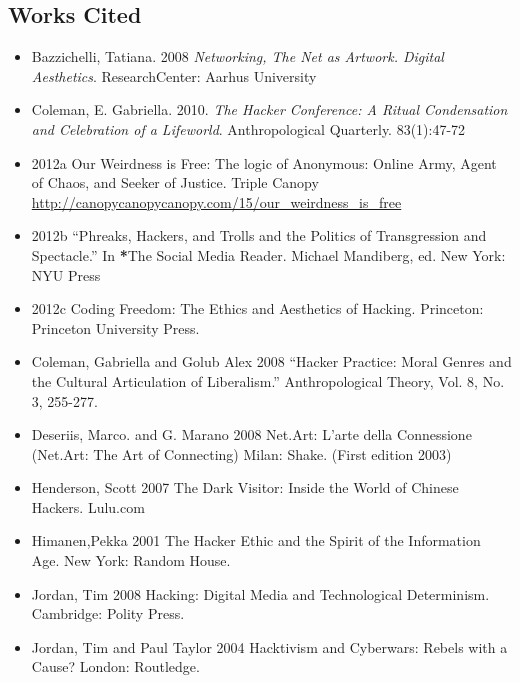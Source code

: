 \documentclass[letterpaper,12pt,english]{sphinxmanual}
\begin{document}
\subsection{Works Cited}
\label{preface:works-cited}\begin{itemize}
\item {} 
Bazzichelli, Tatiana. 2008 \emph{Networking, The Net as Artwork. Digital Aesthetics}. ResearchCenter: Aarhus University

\item {} 
Coleman, E. Gabriella. 2010. \emph{The Hacker Conference: A Ritual Condensation and Celebration of a Lifeworld}. Anthropological Quarterly. 83(1):47-72

\item {} 
2012a Our Weirdness is Free: The logic of Anonymous: Online Army, Agent of Chaos, and Seeker of Justice. Triple Canopy \href{http://canopycanopycanopy.com/15/our\_weirdness\_is\_free}{http://canopycanopycanopy.com/15/our\_weirdness\_is\_free}

\item {} 
2012b ``Phreaks, Hackers, and Trolls and the Politics of Transgression and Spectacle.'' In {\color{red}\bfseries{}*}The Social Media Reader. Michael Mandiberg, ed. New York: NYU Press

\item {} 
2012c Coding Freedom: The Ethics and Aesthetics of Hacking. Princeton: Princeton University Press.

\item {} 
Coleman, Gabriella and Golub Alex 2008 ``Hacker Practice: Moral Genres and the Cultural Articulation of Liberalism.” Anthropological Theory, Vol. 8, No. 3, 255-277.

\item {} 
Deseriis, Marco. and G. Marano 2008 Net.Art: L’arte della Connessione (Net.Art: The Art of Connecting) Milan: Shake. (First edition 2003)

\item {} 
Henderson, Scott 2007 The Dark Visitor: Inside the World of Chinese Hackers. Lulu.com

\item {} 
Himanen,Pekka 2001 The Hacker Ethic and the Spirit of the Information Age. New York: Random House.

\item {} 
Jordan, Tim 2008 Hacking: Digital Media and Technological Determinism. Cambridge: Polity Press.

\item {} 
Jordan, Tim and Paul Taylor 2004 Hacktivism and Cyberwars: Rebels with a Cause? London: Routledge.


\end{itemize}
\end{document}
